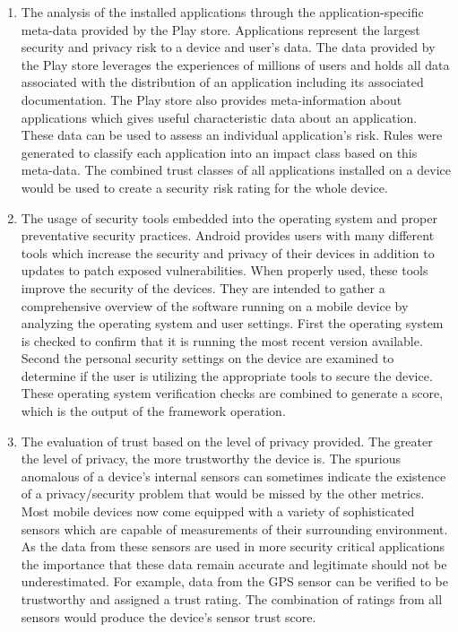\begin{enumerate}
\item The analysis of the installed applications through the application-specific meta-data provided by the Play store. Applications represent the largest security and privacy risk to a device and user's data. The data provided by the Play store leverages the experiences of millions of users and holds all data associated with the distribution of an application including its associated documentation. The Play store also provides meta-information about applications which gives useful characteristic data about an application. These data can be used to assess an individual application's risk. Rules were generated to classify each application into an impact class based on this meta-data. The combined trust classes of all applications installed on a device would be used to create a security risk rating for the whole device.

\item The usage of security tools embedded into the operating system and proper preventative security practices.
Android provides users with many different tools which increase the security and privacy of their devices in addition to updates 
to patch exposed vulnerabilities.  When properly used, these tools improve the security of the devices. They are 
intended to gather a 
comprehensive overview of the software running on a mobile device by analyzing the operating system and user settings. 
First the operating system is checked to confirm that it is running the most recent version available. Second the personal 
security settings on the device are examined to determine if the user is utilizing the appropriate tools to secure the device. 
These operating system verification checks are combined to generate a score, which is the output of the framework operation.

\item The evaluation of trust  based on the level of privacy provided.  The greater the level of privacy, the more
trustworthy the device is.
The spurious anomalous of a device's internal sensors can sometimes indicate the existence of a privacy/security problem 
that would be missed by the other metrics. Most mobile devices now come equipped with a variety of sophisticated 
 sensors which are capable of  measurements of their surrounding environment. 
As the data from these sensors are used in more security critical applications the importance that these data remain accurate and legitimate should not be underestimated. For example, data from the GPS sensor can be verified to be trustworthy and assigned a trust rating. The combination of ratings from all sensors would produce the device's sensor trust score.
\end{enumerate}

